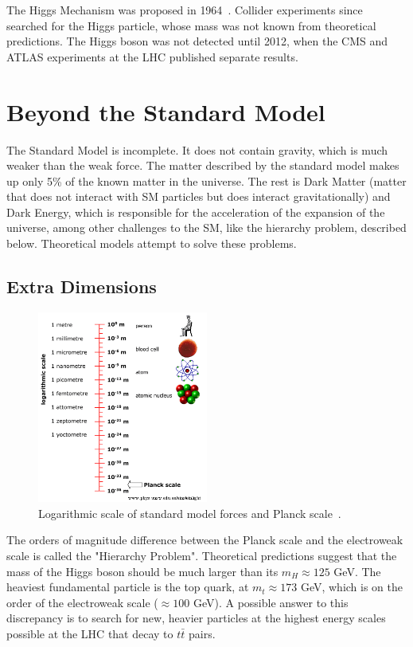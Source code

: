 The Higgs Mechanism was proposed in 1964~\cite{higgs}. Collider experiments since searched for the Higgs particle, whose mass was not known from theoretical predictions. The Higgs boson was not detected until 2012, when the CMS and ATLAS experiments at the LHC published separate results.


\section{Beyond the Standard Model}


The Standard Model is incomplete. It does not contain gravity, which is much weaker than the weak force. The matter described by the standard model makes up only 5\% of the known matter in the universe. The rest is Dark Matter (matter that does not interact with SM particles but does interact gravitationally) and Dark Energy, which is responsible for the acceleration of the expansion of the universe, among other challenges to the SM, like the hierarchy problem, described below. Theoretical models attempt to solve these problems. 


\subsection*{Extra Dimensions}


\begin{figure}[h!]
	\centering
	\includegraphics[width=0.5\textwidth]{figures/Planck_scale.png}
	\caption{Logarithmic scale of standard model forces and Planck scale~\cite{Planck_scale}.}
	\label{fig:planck}
\end{figure}


The orders of magnitude difference between the Planck scale and the electroweak scale is called the "Hierarchy Problem". Theoretical predictions suggest that the mass of the Higgs boson should be much larger than its $m_H \approx 125$ GeV. The heaviest fundamental particle is the top quark, at $m_t \approx 173$ GeV, which is on the order of the electroweak scale ($\approx 100$ GeV). A possible answer to this discrepancy is to search for new, heavier particles at the highest energy scales possible at the LHC that decay to $t\bar{t}$ pairs. 

